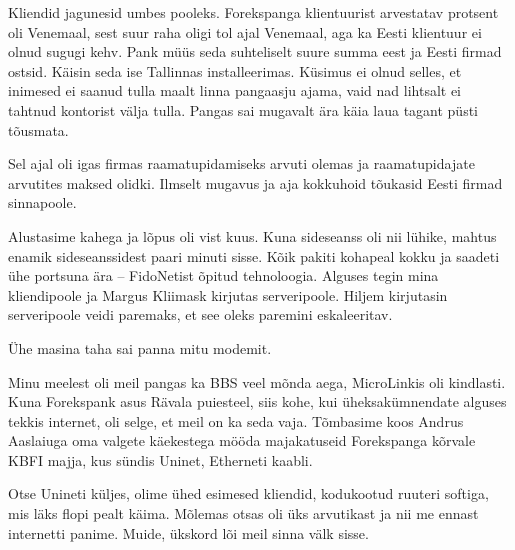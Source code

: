 
Kliendid jagunesid umbes pooleks. Forekspanga klientuurist arvestatav 
protsent oli Venemaal, sest suur 
raha oligi tol ajal Venemaal, aga ka Eesti klientuur ei olnud sugugi kehv. Pank 
müüs seda suhteliselt suure summa eest ja Eesti firmad 
ostsid. Käisin seda ise Tallinnas installeerimas. Küsimus ei olnud 
selles, et inimesed ei saanud tulla maalt linna pangaasju ajama, vaid nad 
lihtsalt ei tahtnud kontorist välja tulla. Pangas sai mugavalt ära käia 
laua tagant püsti tõusmata.


Sel ajal oli igas firmas raamatupidamiseks arvuti olemas ja raamatupidajate 
arvutites maksed olidki. Ilmselt mugavus ja aja kokkuhoid tõukasid
Eesti firmad sinnapoole.


Alustasime kahega ja lõpus oli vist kuus. Kuna 
sideseanss oli nii lühike, mahtus enamik sideseanssidest paari minuti 
sisse. Kõik pakiti kohapeal kokku ja saadeti ühe portsuna ära -- FidoNetist õpitud tehnoloogia. Alguses tegin mina kliendipoole ja 
Margus Kliimask kirjutas serveripoole. Hiljem kirjutasin serveripoole veidi paremaks, et see oleks paremini eskaleeritav.


Ühe masina taha sai panna mitu modemit.


Minu meelest oli meil pangas ka BBS veel mõnda aega, 
MicroLinkis oli kindlasti. Kuna Forekspank asus Rävala puiesteel, siis kohe, kui 
üheksakümnendate alguses tekkis internet, oli selge, et meil on ka 
seda vaja. Tõmbasime koos Andrus Aaslaiuga oma valgete käekestega mööda majakatuseid Forekspanga kõrvale KBFI majja, 
kus sündis Uninet, Etherneti kaabli.


Otse Unineti küljes, olime ühed esimesed kliendid, kodukootud 
ruuteri softiga, mis läks flopi pealt käima. Mõlemas otsas oli üks 
arvutikast ja nii me ennast internetti panime. Muide, ükskord 
lõi meil sinna välk sisse.

